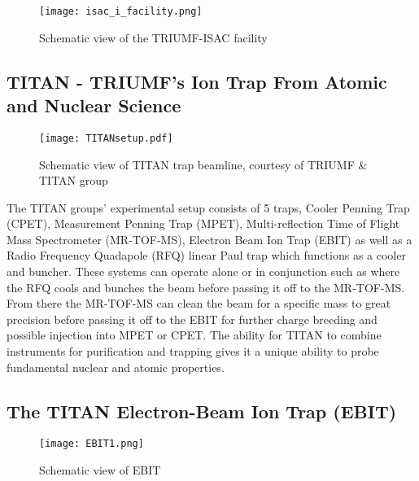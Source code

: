 \documentclass[cnatzke_thesis_proposal.tex]{subfiles}
\begin{document}
\begin{center}
\begin{figure}[H]
  \begin{center}
    \texttt{[image: isac\_i\_facility.png]}
  \end{center}
  \caption{Schematic view of the TRIUMF-ISAC facility \cite{Dilling2014}}
  \label{fig:ISAC_HALL}
\end{figure}
\end{center}


\subsection{TITAN - TRIUMF's Ion Trap From Atomic and Nuclear Science \cite{Dilling2006}}

\begin{figure}[H]
  \begin{center}
    \texttt{[image: TITANsetup.pdf]}
  \end{center}
  \caption{Schematic view of TITAN trap beamline, courtesy of TRIUMF \& TITAN group}
  \label{fig:titan_beamline}
\end{figure}

The TITAN groups' experimental setup consists of 5 traps, Cooler Penning Trap (CPET), Measurement Penning Trap (MPET), Multi-reflection Time of Flight Mass Spectrometer (MR-TOF-MS), Electron Beam Ion Trap (EBIT) as well as a Radio Frequency Quadapole (RFQ) linear Paul trap which functions as a cooler and buncher.  These systems can operate alone or in conjunction such as where the RFQ cools and bunches the beam before passing it off to the MR-TOF-MS.  From there the MR-TOF-MS can clean the beam for a specific mass to great precision before passing it off to the EBIT for further charge breeding and possible injection into MPET or CPET.  The ability for TITAN to combine instruments for purification and trapping gives it a unique ability to probe fundamental nuclear and atomic properties.

\subsection{The TITAN Electron-Beam Ion Trap (EBIT)}

\begin{figure}[H]
  \begin{center}
    \texttt{[image: EBIT1.png]}
  \end{center}
  \caption{Schematic view of EBIT}
  \label{fig:EBIT_CUTOUT}
\end{figure}
\end{document}
